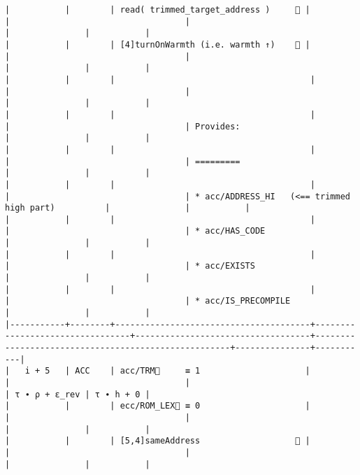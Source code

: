 \documentclass[varwidth=\maxdimen,margin=0.5cm,multi={verbatim}]{standalone}
\begin{document}
\begin{verbatim}
|           |        | read( trimmed_target_address )     👋 |                                 |                                   |                                                     |               |           |
|           |        | [4]turnOnWarmth (i.e. warmth ↑)    👋 |                                 |                                   |                                                     |               |           |
|           |        |                                       |                                 |                                   |                                                     |               |           |
|           |        |                                       |                                 |                                   | Provides:                                           |               |           |
|           |        |                                       |                                 |                                   | =========                                           |               |           |
|           |        |                                       |                                 |                                   | * acc/ADDRESS_HI   (<== trimmed high part)          |               |           |
|           |        |                                       |                                 |                                   | * acc/HAS_CODE                                      |               |           |
|           |        |                                       |                                 |                                   | * acc/EXISTS                                        |               |           |
|           |        |                                       |                                 |                                   | * acc/IS_PRECOMPILE                                 |               |           |
|-----------+--------+---------------------------------------+---------------------------------+-----------------------------------+-----------------------------------------------------+---------------+-----------|
|   i + 5   | ACC    | acc/TRM🚩     ≡ 1                     |                                 |                                   |                                                     | τ ∙ ρ + ε_rev | τ ∙ h + 0 |
|           |        | ecc/ROM_LEX🚩 ≡ 0                     |                                 |                                   |                                                     |               |           |
|           |        | [5,4]sameAddress                   👋 |                                 |                                   |                                                     |               |           |

\end{verbatim}
\end{document}
